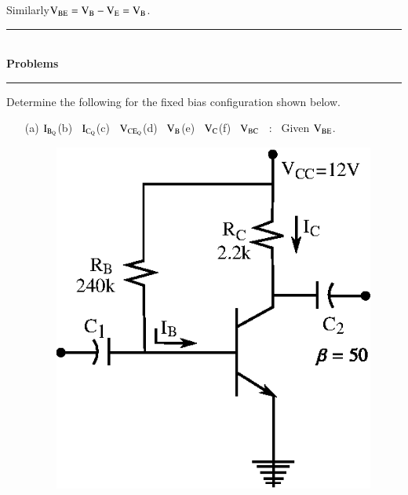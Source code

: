 Similarly\qquad $\textrm{V}_{\text{BE}}=\textrm{V}_{\textrm{B}}-\textrm{V}_{\textrm{E}}=\textrm{V}_{\textrm{B}}$.

\begin{center}
\rule{4cm}{1pt}\\
{\bf\Large Problems}\\[-3pt]
\rule{4cm}{1pt}
\end{center}

\begin{problem}\label{prop3.1}
Determine the following for the fixed bias configuration shown below.
\begin{itemize}
\item[(a)] $\textrm{I}_{\textrm{B}_{\textrm{Q}}}$\quad (b)~ $\textrm{I}_{\textrm{C}_{\textrm{Q}}}$\quad (c)~ $\textrm{V}_{\text{CE}_{\textrm{Q}}}$\quad (d)~ $\textrm{V}_{\textrm{B}}$\quad (e)~ $\textrm{V}_{\textrm{C}}$\quad (f)~ $\textrm{V}_{\text{BC}}$~ :~ Given $\textrm{V}_{\text{BE}}$.
\begin{figure}[H]
\centering
\includegraphics[scale=.95]{chap3/fig3.5.eps}
\end{figure}
\begin{figure}[H]
\centering

\end{figure}
\end{itemize}
\end{problem}
